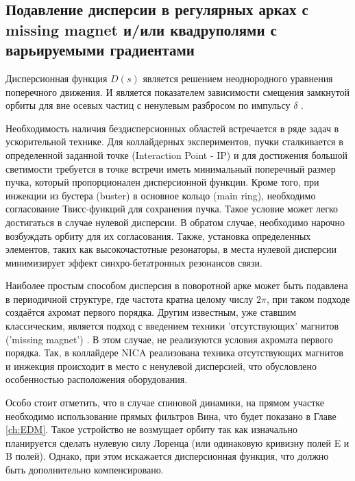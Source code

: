 	\subsection{Подавление дисперсии в регулярных арках с missing magnet и/или квадруполями с варьируемыми градиентами}\label{sec:transition_jump/suppression}

\par Дисперсионная функция $D(s)$ является решением неоднородного уравнения поперечного движения.
И является показателем зависимости смещения замкнутой орбиты для вне осевых частиц с ненулевым разбросом по импульсу $\delta$ \cite{lee}.

\par Необходимость наличия бездисперсионных областей встречается в ряде задач в ускорительной технике. Для коллайдерных экспериментов, пучки сталкивается в определенной заданной точке (Interaction Point - IP) и для достижения большой светимости требуется в точке встречи иметь минимальный поперечный размер пучка, который пропорционален дисперсионной функции. Кроме того, при инжекции из бустера (buster) в основное кольцо (main ring), необходимо согласование Твисс-функций для сохранения пучка. Такое условие может легко достигаться в случае нулевой дисперсии. В обратом случае, необходимо нарочно возбуждать орбиту для их согласования. Также, установка определенных элементов, таких как высокочастотные резонаторы, в места нулевой дисперсии минимизирует эффект синхро-бетатронных резонансов связи.

\par Наиболее простым способом дисперсия в поворотной арке может быть подавлена в периодичной структуре, где частота кратна целому числу $2\pi$, при таком подходе создаётся ахромат первого порядка. Другим известным, уже ставшим классическим, является подход с введением техники 'отсутствующих' магнитов ('missing magnet') \cite{autin:dispersion}. В этом случае, не реализуются условия ахромата первого порядка. Так, в коллайдере NICA реализована техника отсутствующих магнитов и инжекция происходит в место с ненулевой дисперсией, что обусловлено особенностью расположения оборудования.

\par Особо стоит отметить, что в случае спиновой динамики, на прямом участке необходимо использование прямых фильтров Вина, что будет показано в Главе \ref{ch:EDM}. Такое устройство не возмущает орбиту так как изначально планируется сделать нулевую силу Лоренца (или одинаковую кривизну полей E и B полей). Однако, при этом искажается дисперсионная функция, что должно быть дополнительно компенсировано.

